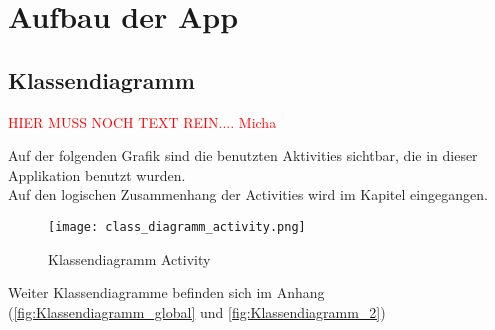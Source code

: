 \newpage
\section{Aufbau der App}

\subsection{Klassendiagramm}  

\textcolor{red}{HIER MUSS NOCH TEXT REIN.... Micha}

Auf der folgenden Grafik sind die benutzten Aktivities sichtbar, die in dieser Applikation benutzt wurden.\\
Auf den logischen Zusammenhang der Activities wird im Kapitel  eingegangen. \\

\begin{figure}[h!]
\label{fig:class_diagramm_activity}
\centering
\texttt{[image: class\_diagramm\_activity.png]} 
\caption{Klassendiagramm Activity}
\end{figure}

Weiter Klassendiagramme befinden sich im Anhang (\ref{fig:Klassendiagramm_global} und \ref{fig:Klassendiagramm_2})